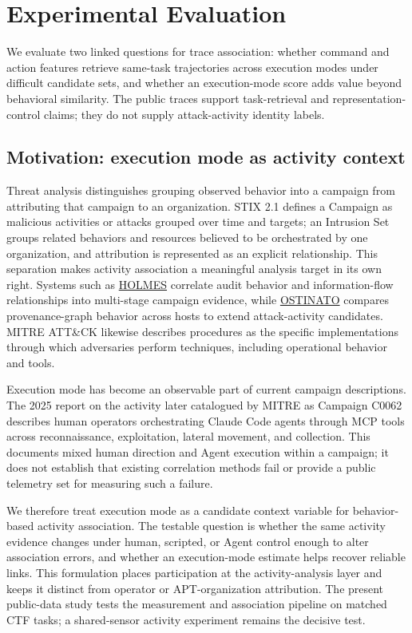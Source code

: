 \section{Experimental Evaluation}
\label{sec:experimental-evaluation}

We evaluate two linked questions for trace association: whether command and action features retrieve same-task trajectories across execution modes under difficult candidate sets, and whether an execution-mode score adds value beyond behavioral similarity. The public traces support task-retrieval and representation-control claims; they do not supply attack-activity identity labels.

\subsection{Motivation: execution mode as activity context}
\label{sec:motivation}

Threat analysis distinguishes grouping observed behavior into a campaign from attributing that campaign to an organization. STIX 2.1 defines a Campaign as malicious activities or attacks grouped over time and targets; an Intrusion Set groups related behaviors and resources believed to be orchestrated by one organization, and attribution is represented as an explicit relationship. This separation makes activity association a meaningful analysis target in its own right. Systems such as \href{https://www.seclab.cs.sunysb.edu/seclab/pubs/holmes19.pdf}{HOLMES} correlate audit behavior and information-flow relationships into multi-stage campaign evidence, while \href{https://arxiv.org/abs/2312.09321}{OSTINATO} compares provenance-graph behavior across hosts to extend attack-activity candidates. MITRE ATT\&CK likewise describes procedures as the specific implementations through which adversaries perform techniques, including operational behavior and tools.

Execution mode has become an observable part of current campaign descriptions. The 2025 report on the activity later catalogued by MITRE as Campaign C0062 describes human operators orchestrating Claude Code agents through MCP tools across reconnaissance, exploitation, lateral movement, and collection. This documents mixed human direction and Agent execution within a campaign; it does not establish that existing correlation methods fail or provide a public telemetry set for measuring such a failure.

We therefore treat execution mode as a candidate context variable for behavior-based activity association. The testable question is whether the same activity evidence changes under human, scripted, or Agent control enough to alter association errors, and whether an execution-mode estimate helps recover reliable links. This formulation places participation at the activity-analysis layer and keeps it distinct from operator or APT-organization attribution. The present public-data study tests the measurement and association pipeline on matched CTF tasks; a shared-sensor activity experiment remains the decisive test.

